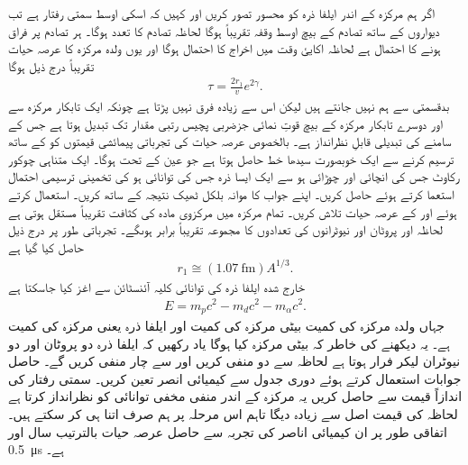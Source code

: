 اگر ہم مرکزہ کے اندر ایلفا ذرہ کو محسور تصور کریں اور کہیں کہ اسکی اوسط سمتی رفتار  ہے تب دیواروں کے ساتھ تصادم کے بیچ اوسط وقفہ تقریباً  ہوگا لحاظہ تصادم کا تعدد  ہوگا۔ ہر تصادم پر فراق ہونے کا احتمال  ہے لحاظہ اکایئ وقت میں اخراج کا احتمال  ہوگا اور یوں ولدہ مرکزہ کا عرصہ حیات تقریباً درج ذیل ہوگا
\begin{align}
	\tau=\frac{2r_{1}}{v} e^{2\gamma}.
\end{align}
بدقسمتی سے ہم  نہیں جانتے ہیں لیکن اس سے زیادہ فرق نہیں پڑتا ہے چونکہ ایک تابکار مرکزہ سے اور دوسرے تابکار مرکزہ کے بیچ قوتِ نمائی جزضربی پچیس رتبی مقدار تک تبدیل ہوتا ہے جس کے سامنے  کی تبدیلی قابلِ نظرانداز ہے۔ بالخصوص عرصہ حیات کی تجرباتی پیمائشی قیمتوں کو  کے ساتھ ترسیم کرنے سے ایک خوبصورت سیدھا خط  حاصل ہوتا ہے جو عین  کے تحت ہوگا۔
ایک متناہی چوکور رکاوٹ جس کی انچائی  اور چوڑائی  ہو سے ایک ایسا ذرہ جس کی توانائی  ہو کی تخمینی ترسیمی احتمال  استعما کرتے ہوئے حاصل کریں۔ اپنے جواب کا موانہ بلکل ٹھیک نتیجہ  کے ساتھ کریں۔
 استعمال کرتے ہوئے  اور  کے عرصہ حیات تلاش کریں۔ تمام مرکزہ میں مرکزوی مادہ کی کثافت تقریباً مستقل ہوتی ہے لحاظہ  اور  پروٹان اور نیوٹرانوں کی تعدادوں کا مجموعہ تقریباً برابر ہوںگے۔ تجرباتی طور پر درج ذیل حاصل کیا گیا ہے
\begin{align}
	r_{1}\cong(\SI{1.07}{\femto\meter})A^{1/3}.
\end{align}
خارج شدہ ایلفا ذرہ کی توانائی کلیہ آئنسٹائن  سے اغز کیا جاسکتا ہے
\begin{align}
	E=m_{p}c^{2}-m_{d}c^{2}-m_{\alpha}c^{2}.
\end{align}
جہاں  ولدہ مرکزہ کی کمیت  بیٹی مرکزہ کی کمیت اور  ایلفا ذرہ یعنی  مرکزہ کی کمیت ہے۔ یہ دیکھنے کی خاطر کہ بیٹی مرکزہ کیا ہوگا یاد رکھیں کہ ایلفا ذرہ دو پروٹان اور دو نیوٹران لیکر فرار ہوتا ہے لحاظہ  سے دو منفی کریں اور  سے چار منفی کریں گے۔ حاصل جوابات استعمال کرتے ہوئے دوری جدول سے کیمیائی انصر تعین کریں۔ سمتی رفتار  کی اندازاً قیمت  سے حاصل کریں یہ مرکزہ کے اندر منفی مخفی توانائی کو نظرانداز کرتا ہے لحاظہ  کی قیمت اصل سے زیادہ دیگا تاہم اس مرحلہ پر ہم صرف اتنا ہی کر سکتے ہیں۔ اتفاقی طور پر ان کیمیائی اناصر کی تجربہ سے حاصل عرصہ حیات بالترتیب  سال اور \SI{0.5}     {\micro\second} ہے۔



